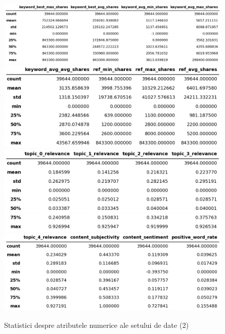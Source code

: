 \documentclass{article}
\begin{document}
\begin{figure}[htb]
    \centering
    \includegraphics[scale=0.4]{news_popularity/analysis/numeric/table5.png}
    \includegraphics[scale=0.4]{news_popularity/analysis/numeric/table6.png}
    \includegraphics[scale=0.4]{news_popularity/analysis/numeric/table7.png}
    \includegraphics[scale=0.4]{news_popularity/analysis/numeric/table8.png}
    \caption{Statistici despre atributele numerice ale setului de date (2)}
    \label{fig:news:num_attr2}
\end{figure}
\end{document}
